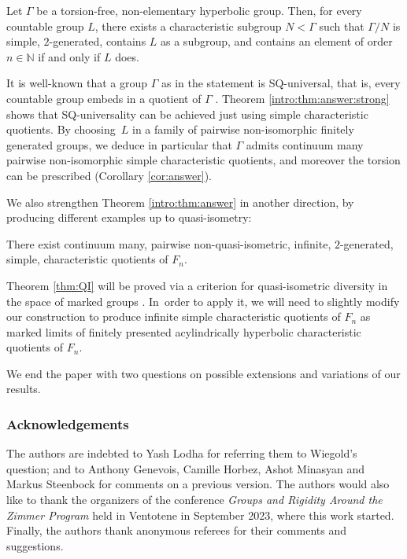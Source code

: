 \begin{theorem}
\label{intro:thm:answer:strong}
Let $\Gamma$ be a torsion-free, non-elementary hyperbolic group. Then, for every countable group $L$, there exists a characteristic subgroup $N < \Gamma$ such that $\Gamma / N$ is simple, $2$-generated, contains $L$ as a subgroup, and contains an element of order $n \in \mathbb{N}$ if and only if $L$ does.
\end{theorem}

It is well-known that a group $\Gamma$ as in the statement is SQ-universal, that is, every countable group embeds in a quotient of $\Gamma$ \cite{SQ1, SQ2}. Theorem \ref{intro:thm:answer:strong} shows that SQ-universality can be achieved just using simple characteristic quotients. By choosing~$L$ in a family of pairwise non-isomorphic finitely generated groups, we deduce in particular that $\Gamma$ admits continuum many pairwise non-isomorphic simple characteristic quotients, and moreover the torsion can be prescribed (Corollary \ref{cor:answer}).

We also strengthen Theorem \ref{intro:thm:answer} in another direction, by producing different examples up to quasi-isometry:

\begin{theorem}
\label{intro:thm:QI}
There exist continuum many, pairwise non-quasi-isometric, infinite, $2$-generated, simple, characteristic quotients of $F_n$.
\end{theorem}

Theorem \ref{thm:QI} will be proved via a criterion for quasi-isometric diversity in the space of marked groups \cite{diversity}. In~order to apply it, we will need to slightly modify our construction to produce infinite simple characteristic quotients of $F_n$ as marked limits of finitely presented acylindrically hyperbolic characteristic quotients of $F_n$.

We end the paper with two questions on possible extensions and variations of our results.

\subsubsection*{Acknowledgements}
The authors are indebted to Yash Lodha for referring them to Wiegold's question; and to Anthony Genevois, Camille Horbez, Ashot Minasyan and Markus Steenbock for comments on a previous version.
The authors would also like to thank the organizers of the conference \emph{Groups and Rigidity Around the Zimmer Program} held in Ventotene in September 2023, where this work started.
Finally, the authors thank anonymous referees for their comments and suggestions.


